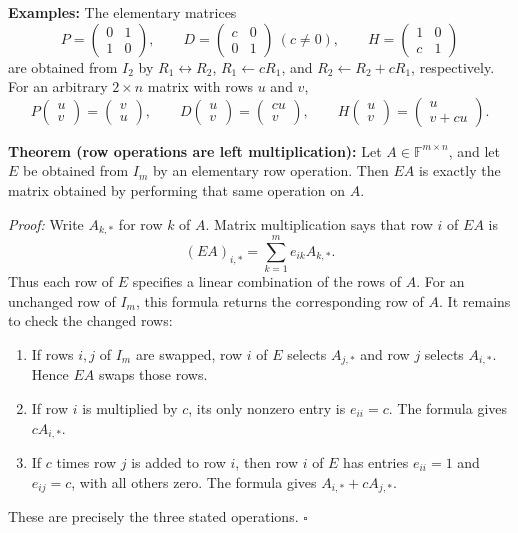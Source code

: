 \documentclass[a4paper,11pt,abstract=true]{scrartcl}
\theoremstyle{dotlessP}
\theoremstyle{dotlessS}
\theoremstyle{remark}
\theoremstyle{definition}
\begin{document}
\begin{example_box}
\textbf{Examples:} The elementary matrices
\[
P=\begin{pmatrix}0&1\\1&0\end{pmatrix},\qquad
D=\begin{pmatrix}c&0\\0&1\end{pmatrix}\ (c\neq0),\qquad
H=\begin{pmatrix}1&0\\c&1\end{pmatrix}
\]
are obtained from $I_2$ by $R_1\leftrightarrow R_2$,
$R_1\leftarrow cR_1$, and $R_2\leftarrow R_2+cR_1$, respectively.
For an arbitrary $2\times n$ matrix with rows $u$ and $v$,
\[
P\begin{pmatrix}u\\v\end{pmatrix}=\begin{pmatrix}v\\u\end{pmatrix},
\qquad
D\begin{pmatrix}u\\v\end{pmatrix}=\begin{pmatrix}cu\\v\end{pmatrix},
\qquad
H\begin{pmatrix}u\\v\end{pmatrix}=\begin{pmatrix}u\\v+cu\end{pmatrix}.
\]
\end{example_box}

\begin{claim_box}
\textbf{Theorem (row operations are left multiplication):}
Let $A\in\mathbb{F}^{m\times n}$, and let $E$ be obtained from $I_m$
by an elementary row operation. Then $EA$ is exactly the matrix
obtained by performing that same operation on $A$.

\textit{Proof:} Write $A_{k,*}$ for row $k$ of $A$. Matrix
multiplication says that row $i$ of $EA$ is
\[
{(EA)}_{i,*}=\sum_{k=1}^m e_{ik}A_{k,*}.
\]
Thus each row of $E$ specifies a linear combination of the rows of $A$.
For an unchanged row of $I_m$, this formula returns the corresponding
row of $A$. It remains to check the changed rows:
\begin{enumerate}
    \item If rows $i,j$ of $I_m$ are swapped, row $i$ of $E$ selects
    $A_{j,*}$ and row $j$ selects $A_{i,*}$. Hence $EA$ swaps those rows.
    \item If row $i$ is multiplied by $c$, its only nonzero entry
    is $e_{ii}=c$. The formula gives $cA_{i,*}$.
    \item If $c$ times row $j$ is added to row $i$, then row $i$
    of $E$ has entries $e_{ii}=1$ and $e_{ij}=c$, with all others
    zero. The formula gives $A_{i,*}+cA_{j,*}$.
\end{enumerate}
These are precisely the three stated operations. \hfill$\square$
\end{claim_box}
\end{document}
